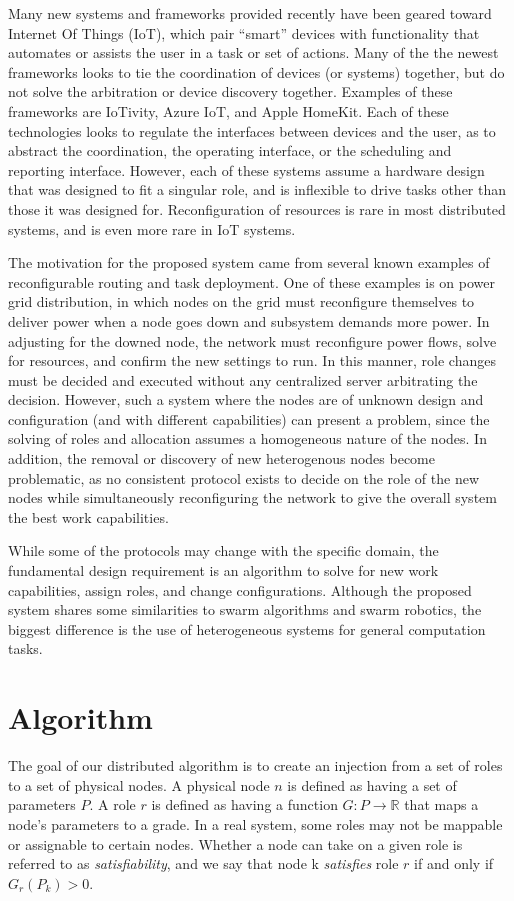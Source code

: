 \documentclass[11pt]{article}
\begin{document}
\begin{multicols}{2}
Many new systems and frameworks provided recently have been geared toward Internet Of Things (IoT), which pair ``smart'' devices with functionality that automates or assists the user in a task or set of actions.  Many of the the newest frameworks looks to tie the coordination of devices (or systems) together, but do not solve the arbitration or device discovery together.  Examples of these frameworks are IoTivity, Azure IoT, and Apple HomeKit.  Each of these technologies looks to regulate the interfaces between devices and the user, as to abstract the coordination, the operating interface, or the scheduling and reporting interface.  However, each of these systems assume a hardware design that was designed to fit a singular role, and is inflexible to drive tasks other than those it was designed for.  Reconfiguration of resources is rare in most distributed systems, and is even more rare in IoT systems.  

The motivation for the proposed system came from several known examples of reconfigurable routing and task deployment.  One of these examples is on power grid distribution, in which nodes on the grid must reconfigure themselves to deliver power when a node goes down and subsystem demands more power.  In adjusting for the downed node, the network must reconfigure power flows, solve for resources, and confirm the new settings to run.  In this manner, role changes must be decided and executed without any centralized server arbitrating the decision.  However, such a system where the nodes are of unknown design and configuration (and with different capabilities) can present a problem, since the solving of roles and allocation assumes a homogeneous nature of the nodes.  In addition, the removal or discovery of new heterogenous nodes become problematic, as no consistent protocol exists to decide on the role of the new nodes while simultaneously reconfiguring the network to give the overall system the best work capabilities.  

While some of the protocols may change with the specific domain, the fundamental design requirement is an algorithm to solve for new work capabilities, assign roles, and change configurations.  Although the proposed system shares some similarities to swarm algorithms and swarm robotics, the biggest difference is the use of heterogeneous systems for general computation tasks.  

\section{Algorithm}
The goal of our distributed algorithm is to create an injection from a set of roles to a set of physical nodes. A physical node $n$ is defined as having a set of parameters $P$. A role $r$ is defined as having a function $G: P \rightarrow \mathbb{R}$ that maps a node's parameters to a grade. In a real system, some roles may not be mappable or assignable to certain nodes. Whether a node can take on a given role is referred to as \textit{satisfiability}, and we say that node k \textit{satisfies} role $r$ if and only if $G_{r}(P_{k}) > 0$. 


\end{multicols}
\end{document}
